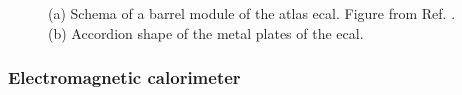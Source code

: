 \begin{figure}[ht]
\centering
{}
\caption{(a) Schema of a barrel module of the \gls{atlas} \gls{ecal}. Figure from Ref. \cite{atlas:atlas}. (b) Accordion shape of the metal plates of the \gls{ecal}.}
\label{fig:atlas:lar}
\end{figure}

\subsubsection*{Electromagnetic calorimeter}

